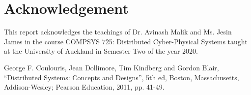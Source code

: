\documentclass[conference]{IEEEtran}
\begin{document}

\section*{Acknowledgement}
This report acknowledges the teachings of Dr. Avinash Malik and Ms. Jesin James
in the course COMPSYS 725: Distributed Cyber-Physical Systems taught at the
University of Auckland in Semester Two of the year 2020.

\begin{thebibliography}{00}
 George F. Coulouris, Jean Dollimore, Tim Kindberg and Gordon
  Blair, ``Distributed Systems: Concepts and Designs'', 5th ed, Boston,
    Massachusetts, Addison-Wesley; Pearson Education, 2011, pp. 41-49.
\end{thebibliography}
\vspace{12pt}
\end{document}
